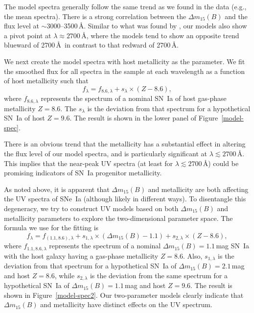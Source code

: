 \documentclass[useAMS,usenatbib]{mn2e}
\newcommand{\deltam}{\ensuremath{\Delta m_{15}}}
\begin{document}
The model spectra generally follow the same trend as we found in the data (e.g., the mean spectra). There is a strong correlation between the $\deltam(B)$ and the flux level at $\sim3000$--3500\,\AA. Similar to what was found by \citet{2016MNRAS.461.1308F}, our models also show a pivot point at $\lambda\approx2700$\,\AA, where the models tend to show an opposite trend blueward of 2700\,\AA\ in contrast to that redward of 2700\,\AA.

We next create the model spectra with host metallicity as the parameter. We fit the smoothed flux for all spectra in the sample at each wavelength as a function of host metallicity such that
\begin{equation}
f_{\lambda}=f_{8.6,\lambda}+s_{\lambda}\times(Z-8.6),
\end{equation}
where $f_{8.6,\lambda}$ represents the spectrum of a nominal SN~Ia of host gas-phase metallicity $Z=8.6$. The $s_{\lambda}$ is the deviation from that spectrum for a hypothetical SN~Ia of host $Z=9.6$. The result is shown in the lower panel of Figure~\ref{model-spec}.

There is an obvious trend that the metallicity has a substantial effect in altering the flux level of our model spectra, and is particularly significant at $\lambda\lesssim2700$\,\AA. This implies that the near-peak UV spectra (at least for $\lambda\lesssim2700$\,\AA) could be promising indicators of SN~Ia progenitor metallicity.

As noted above, it is apparent that $\deltam(B)$ and metallicity are both affecting the UV spectra of SNe~Ia (although likely in different ways). To disentangle this degeneracy, we try to construct UV models based on both $\deltam(B)$ and metallicity parameters to explore the two-dimensional parameter space. The formula we use for the fitting is 
\begin{equation}
f_{\lambda}=f_{(1.1,8.6),\lambda}+s_{1,\lambda}\times(\deltam(B)-1.1)+s_{2,\lambda}\times(Z-8.6),
\end{equation}
where $f_{1.1,8.6,\lambda}$ represents the spectrum of a nominal $\deltam(B)=1.1$\,mag SN~Ia with the host galaxy having a gas-phase metallicity $Z=8.6$. Also, $s_{1,\lambda}$ is the deviation from that spectrum for a hypothetical SN~Ia of $\deltam(B)=2.1$\,mag and host $Z=8.6$, while $s_{2,\lambda}$ is the deviation from the same spectrum for a hypothetical SN~Ia of $\deltam(B)=1.1$\,mag and host $Z=9.6$. The result is shown in Figure~\ref{model-spec2}. Our two-parameter models clearly indicate that $\deltam(B)$ and metallicity have distinct effects on the UV spectrum.
\end{document}
